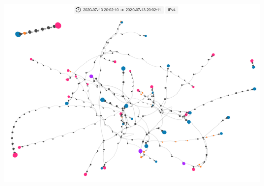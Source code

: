 \documentclass{weeklyreport}
\begin{document}
{\centering \includegraphics[width=\linewidth]{week_2/Annotation 2020-07-13 163617.png}}
\end{document}
